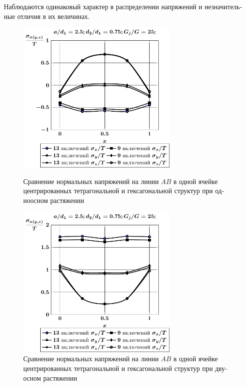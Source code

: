 \begin{russian}
Наблюдаются одинаковый характер в распределении напряжений и незначительные отличия в их величинах.

\begin{figure}[h!]
\centering\footnotesize
\parbox[b]{7.5cm}{\centering\includegraphics[width=8cm]{inc13-9-a25-d75-g25-t1.pdf}
\caption{Сравнение нормальных напряжений на линии $AB$ в одной ячейке центрированных тетрагональной и гексагональной структур при одноосном растяжении
\label{f:9:87}}}\hfil\hfil
\parbox[b]{7.5cm}{\centering\includegraphics[width=8cm]{inc13-9-a25-d75-g25-t2.pdf}
\caption{Сравнение нормальных напряжений на линии $AB$ в одной ячейке центрированных тетрагональной и гексагональной структур при двуосном растяжении
\label{f:9:88}}}
\end{figure}

\end{russian}
